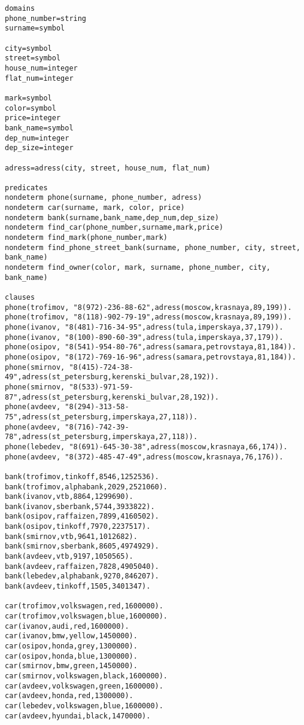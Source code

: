 \begin{lstlisting}
domains
phone_number=string
surname=symbol

city=symbol
street=symbol
house_num=integer
flat_num=integer

mark=symbol
color=symbol
price=integer
bank_name=symbol
dep_num=integer
dep_size=integer

adress=adress(city, street, house_num, flat_num)

predicates
nondeterm phone(surname, phone_number, adress)
nondeterm car(surname, mark, color, price)
nondeterm bank(surname,bank_name,dep_num,dep_size)
nondeterm find_car(phone_number,surname,mark,price)
nondeterm find_mark(phone_number,mark)
nondeterm find_phone_street_bank(surname, phone_number, city, street, bank_name)
nondeterm find_owner(color, mark, surname, phone_number, city, bank_name)

clauses
phone(trofimov, "8(972)-236-88-62",adress(moscow,krasnaya,89,199)).
phone(trofimov, "8(118)-902-79-19",adress(moscow,krasnaya,89,199)).
phone(ivanov, "8(481)-716-34-95",adress(tula,imperskaya,37,179)).
phone(ivanov, "8(100)-890-60-39",adress(tula,imperskaya,37,179)).
phone(osipov, "8(541)-954-80-76",adress(samara,petrovstaya,81,184)).
phone(osipov, "8(172)-769-16-96",adress(samara,petrovstaya,81,184)).
phone(smirnov, "8(415)-724-38-49",adress(st_petersburg,kerenski_bulvar,28,192)).
phone(smirnov, "8(533)-971-59-87",adress(st_petersburg,kerenski_bulvar,28,192)).
phone(avdeev, "8(294)-313-58-75",adress(st_petersburg,imperskaya,27,118)).      
phone(avdeev, "8(716)-742-39-78",adress(st_petersburg,imperskaya,27,118)).      
phone(lebedev, "8(691)-645-30-38",adress(moscow,krasnaya,66,174)).
phone(avdeev, "8(372)-485-47-49",adress(moscow,krasnaya,76,176)).

bank(trofimov,tinkoff,8546,1252536).
bank(trofimov,alphabank,2029,2521060).
bank(ivanov,vtb,8864,1299690).
bank(ivanov,sberbank,5744,3933822).
bank(osipov,raffaizen,7899,4160502).
bank(osipov,tinkoff,7970,2237517).
bank(smirnov,vtb,9641,1012682).
bank(smirnov,sberbank,8605,4974929).
bank(avdeev,vtb,9197,1050565).
bank(avdeev,raffaizen,7828,4905040).
bank(lebedev,alphabank,9270,846207).
bank(avdeev,tinkoff,1505,3401347).

car(trofimov,volkswagen,red,1600000).
car(trofimov,volkswagen,blue,1600000).
car(ivanov,audi,red,1600000).
car(ivanov,bmw,yellow,1450000).
car(osipov,honda,grey,1300000).
car(osipov,honda,blue,1300000).
car(smirnov,bmw,green,1450000).
car(smirnov,volkswagen,black,1600000).
car(avdeev,volkswagen,green,1600000).
car(avdeev,honda,red,1300000).
car(lebedev,volkswagen,blue,1600000).
car(avdeev,hyundai,black,1470000).


\end{lstlisting}
